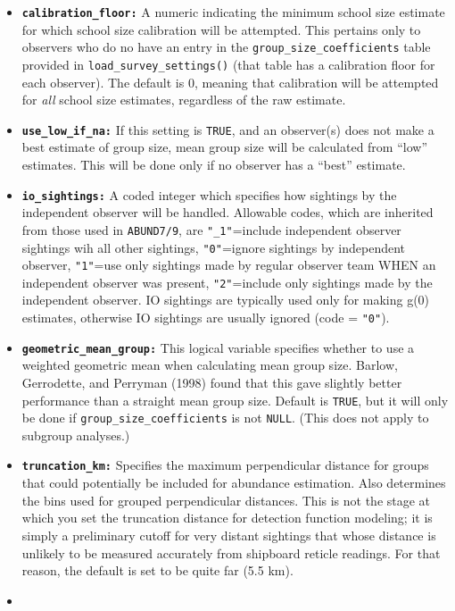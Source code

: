 \documentclass[
]{book}
\begin{document}
\begin{itemize}
\item
  \textbf{\texttt{calibration\_floor:}} A numeric indicating the minimum school size estimate for which school size calibration will be attempted. This pertains only to observers who do no have an entry in the \texttt{group\_size\_coefficients} table provided in \texttt{load\_survey\_settings()} (that table has a calibration floor for each observer). The default is 0, meaning that calibration will be attempted for \emph{all} school size estimates, regardless of the raw estimate.
\item
  \textbf{\texttt{use\_low\_if\_na:}} If this setting is \texttt{TRUE}, and an observer(s) does not make a best estimate of group size, mean group size will be calculated from ``low'' estimates. This will be done only if no observer has a ``best'' estimate.
\item
  \textbf{\texttt{io\_sightings:}} A coded integer which specifies how sightings by the independent observer will be handled. Allowable codes, which are inherited from those used in \texttt{ABUND7/9}, are \texttt{"\_1"}=include independent observer sightings wih all other sightings, \texttt{"0"}=ignore sightings by independent observer, \texttt{"1"}=use only sightings made by regular observer team WHEN an independent observer was present, \texttt{"2"}=include only sightings made by the independent observer. IO sightings are typically used only for making g(0) estimates, otherwise IO sightings are usually ignored (code = \texttt{"0"}).
\item
  \textbf{\texttt{geometric\_mean\_group:}} This logical variable specifies whether to use a weighted geometric mean when calculating mean group size. Barlow, Gerrodette, and Perryman (1998) found that this gave slightly better performance than a straight mean group size. Default is \texttt{TRUE}, but it will only be done if \texttt{group\_size\_coefficients} is not \texttt{NULL}. (This does not apply to subgroup analyses.)
\item
  \textbf{\texttt{truncation\_km:}} Specifies the maximum perpendicular distance for groups that could potentially be included for abundance estimation. Also determines the bins used for grouped perpendicular distances. This is not the stage at which you set the truncation distance for detection function modeling; it is simply a preliminary cutoff for very distant sightings that whose distance is unlikely to be measured accurately from shipboard reticle readings. For that reason, the default is set to be quite far (5.5 km).
\item

\end{itemize}
\end{document}
